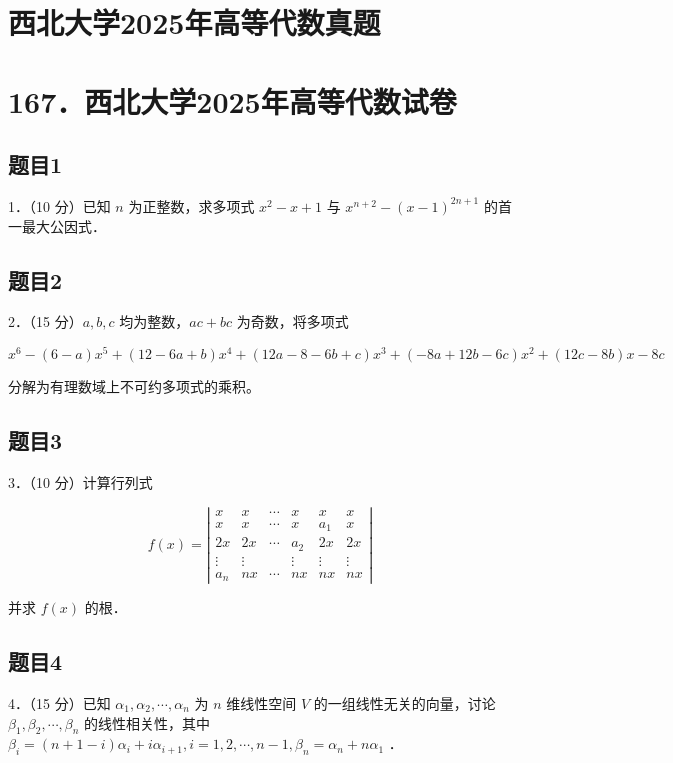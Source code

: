\documentclass{article}
\begin{document}
\section*{西北大学2025年高等代数真题}
\section*{167．西北大学2025年高等代数试卷}

\subsection{题目1}
1．（10 分）已知 \(n\) 为正整数，求多项式 \(x^{2}-x+1\) 与 \(x^{n+2}-(x-1)^{2 n+1}\) 的首一最大公因式．

\subsection{题目2}
2．（15 分）\(a, b, c\) 均为整数，\(a c+b c\) 为奇数，将多项式

\[
x^{6}-(6-a) x^{5}+(12-6 a+b) x^{4}+(12 a-8-6 b+c) x^{3}+(-8 a+12 b-6 c) x^{2}+(12 c-8 b) x-8 c
\]

分解为有理数域上不可约多项式的乘积。

\subsection{题目3}
3．（10 分）计算行列式

\[
f(x)=\left|\begin{array}{cccccc}
x & x & \cdots & x & x & x \\
x & x & \cdots & x & a_{1} & x \\
2 x & 2 x & \cdots & a_{2} & 2 x & 2 x \\
\vdots & \vdots & & \vdots & \vdots & \vdots \\
a_{n} & n x & \cdots & n x & n x & n x
\end{array}\right|
\]

并求 \(f(x)\) 的根．

\subsection{题目4}
4．（15 分）已知 \(\alpha_{1}, \alpha_{2}, \cdots, \alpha_{n}\) 为 \(n\) 维线性空间 \(V\) 的一组线性无关的向量，讨论 \(\beta_{1}, \beta_{2}, \cdots, \beta_{n}\) 的线性相关性，其中 \(\beta_{i}=(n+1-i) \alpha_{i}+i \alpha_{i+1}, i=1,2, \cdots, n-1, \beta_{n}=\alpha_{n}+n \alpha_{1}\) ．
\end{document}
